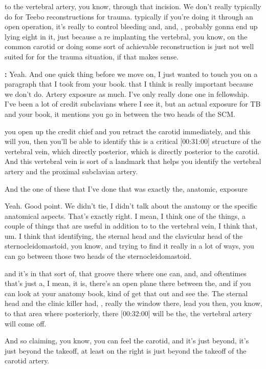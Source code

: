 \documentclass[
]{book}
\begin{document}
to the vertebral artery, you know, through that incision. We don't
really typically do for Teebo reconstructions for trauma. typically if
you're doing it through an open operation, it's really to control
bleeding and, and, , probably gonna end up lying eight in it, just
because a re implanting the vertebral, you know, on the common carotid
or doing some sort of achievable reconstruction is just not well suited
for for the trauma situation, if that makes sense.

\textbf{:} Yeah. And one
quick thing before we move on, I just wanted to touch you on a paragraph
that I took from your book. that I think is really important because
we don't do. Artery exposure as much. I've only really done one in
fellowship. I've been a lot of credit subclavians where I see it, but an
actual exposure for TB and your book, it mentions you go in between the
two heads of the SCM.

you open up the credit chief and you retract the carotid
immediately, and this will you, then you'll be able to identify this is
a critical {[}00:31:00{]} structure of the vertebral vein, which directly
posterior, which is directly posterior to the carotid. And this
vertebral vein is sort of a landmark that helps you identify the
vertebral artery and the proximal subclavian artery.

And the one of these that I've done that was exactly the, anatomic,
exposure

Yeah. Good
point. We didn't tie, I didn't talk about the anatomy or the specific
anatomical aspects. That's exactly right. I mean, I think one of the
things, a couple of things that are useful in addition to to the
vertebral vein, I think that, um. I think that identifying, the sternal
head and the clavicular head of the sternocleidomastoid, you know, and
trying to find it really in a lot of ways, you can go between those two
heads of the sternocleidomastoid.

and it's in that sort of, that groove there where one can, and,
and oftentimes that's just a, I mean, it is, there's an open plane there
between the, and if you can look at your anatomy book, kind of get that
out and see the. The sternal head and the clinic killer had, , really
the window there, lead you then, you know, to that area where
posteriorly, there {[}00:32:00{]} will be the, the vertebral artery will
come off.

And so claiming, you know, you can feel the carotid, and it's
just beyond, it's just beyond the takeoff, at least on the right is
just beyond the takeoff of the carotid artery.
\end{document}
